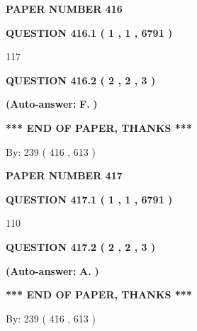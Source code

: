 \documentclass{ctexart}
\begin{document}
 
 
   
   
   
   
   
   
 
 
 
 
   
   
   
   
\setcounter{page}{ 
   416001 } 
   
   
 {\textbf{ \Large{ PAPER NUMBER  416  }}}
   
   
   
   
  
  
{\textbf{\large{QUESTION
416.1 
 ( 1 , 1 , 6791 )
}}}

117
  
  
{\textbf{\large{QUESTION
416.2 
 ( 2 , 2 , 3 )
}}}
 
 
{\textbf{(Auto-answer:}}
{\textbf{\large{
F.}}}
{\textbf{)}}
 
 
   
   
   
   
\vspace{1.0in} 
{\textbf{\large{ *** END OF PAPER, THANKS *** }}} 
   
   
\hspace{1.0in} By: 
 239 ( 416 ,  613 )
   
   
   
   
\newpage 
\setcounter{page}{ 
   417001 } 
   
   
 {\textbf{ \Large{ PAPER NUMBER  417  }}}
   
   
   
   
  
  
{\textbf{\large{QUESTION
417.1 
 ( 1 , 1 , 6791 )
}}}

110
  
  
{\textbf{\large{QUESTION
417.2 
 ( 2 , 2 , 3 )
}}}
 
 
{\textbf{(Auto-answer:}}
{\textbf{\large{
A.}}}
{\textbf{)}}
 
 
   
   
   
   
\vspace{1.0in} 
{\textbf{\large{ *** END OF PAPER, THANKS *** }}} 
   
   
\hspace{1.0in} By: 
 239 ( 416 ,  613 )
   
   
   
\end{document}
